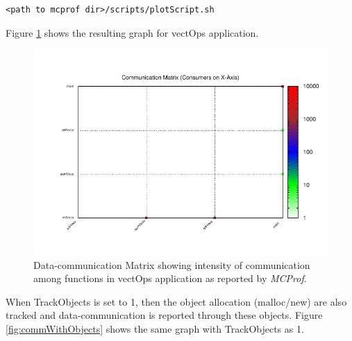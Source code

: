 \documentclass[10pt]{article}
\newcommand{\MCPROF}{\emph{MCProf}}
\begin{document}
{
\small
\begin{Verbatim}[frame=single]
<path to mcprof dir>/scripts/plotScript.sh
\end{Verbatim}
}

Figure \ref{fig:matrix} shows the resulting graph for vectOps application.

\begin{figure}[!h]
\centering
\includegraphics[width=0.95\linewidth]{figures/matrix.pdf}
\caption{Data-communication Matrix showing intensity of communication
    among functions in vectOps application as reported by \MCPROF{}.}
\label{fig:matrix}
\end{figure}


When TrackObjects is set to 1, then the object allocation (malloc/new) are
also tracked and data-communication is reported through these objects. 
Figure \ref{fig:commWithObjects} shows the same graph with TrackObjects as 1.
\end{document}
